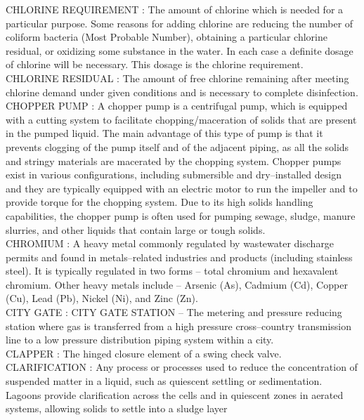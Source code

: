 \vspace{0.15cm}
CHLORINE REQUIREMENT :    The amount of chlorine which is needed for a particular purpose. Some reasons for adding chlorine are reducing the number of coliform bacteria (Most Probable Number), obtaining a particular chlorine residual, or oxidizing some substance in the water. In each case a definite dosage of chlorine will be necessary. This dosage is the chlorine requirement.\\
\vspace{0.15cm}
CHLORINE RESIDUAL :  The amount of free chlorine remaining after meeting chlorine demand under given conditions and is necessary to complete disinfection.\\
\vspace{0.15cm}
CHOPPER PUMP :   A chopper pump is a centrifugal pump, which is equipped with a cutting system to facilitate chopping/maceration of solids that are present in the pumped liquid. The main advantage of this type of pump is that it prevents clogging of the pump itself and of the adjacent piping, as all the solids and stringy materials are macerated by the chopping system. Chopper pumps exist in various configurations, including submersible and dry–installed design and they are typically equipped with an electric motor to run the impeller and to provide torque for the chopping system. Due to its high solids handling capabilities, the chopper pump is often used for pumping sewage, sludge, manure slurries, and other liquids that contain large or tough solids.\\
\vspace{0.15cm}
CHROMIUM :   A heavy metal commonly regulated by wastewater discharge permits and found in metals–related industries and products (including stainless steel). It is typically regulated in two forms – total chromium and hexavalent chromium. Other heavy metals include – Arsenic (As), Cadmium (Cd), Copper (Cu), Lead (Pb), Nickel (Ni), and Zinc (Zn).\\
\vspace{0.15cm}
CITY GATE :  CITY GATE STATION –  The metering and pressure reducing station where gas is transferred from a high pressure cross–country transmission line to a low pressure distribution piping system within a city.\\
\vspace{0.15cm}
CLAPPER :   The hinged closure element of a swing check valve.\\
\vspace{0.15cm}
CLARIFICATION :  Any process or processes used to reduce the concentration of suspended matter in a liquid, such as quiescent settling or sedimentation. Lagoons provide clarification across the cells and in quiescent zones in aerated systems, allowing solids to settle into a sludge layer\\
